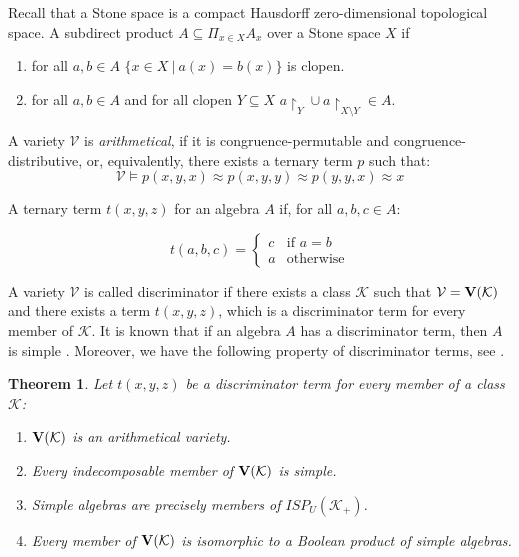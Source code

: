\documentclass[a4paper]{article}
\theoremstyle{defin}
\theoremstyle{theorem}
\newtheorem{theorem}{Theorem}
\theoremstyle{claim}
\theoremstyle{prop}
\theoremstyle{lemma}
\theoremstyle{fact}
\theoremstyle{ex}
\theoremstyle{col}
\begin{document}
Recall that a Stone space is a compact Hausdorff zero-dimensional topological space. A subdirect product $A \subseteq \Pi_{x \in X} A_x$ over a Stone space $X$ if
\begin{enumerate}
\item for all $a, b \in A$ $\{ x \in X \: | \: a(x) = b(x) \}$ is clopen.
\item for all $a, b \in A$ and for all clopen $Y \subseteq X$ $a \upharpoonright_{Y} \cup a \upharpoonright_{X \setminus Y} \in A$.
\end{enumerate}

A variety $\mathcal{V}$ is \emph{arithmetical}, if it is congruence-permutable and congruence-distributive, or, equivalently, there exists a ternary term $p$ such that:
\begin{equation}
\mathcal{V} \models p(x,y,x) \approx p(x,y,y) \approx p(y,y,x) \approx x
\end{equation}

A ternary term $t(x, y, z)$ for an algebra $A$ if, for all $a, b, c \in A$:

\begin{equation}
t(a,b,c) =
  \begin{cases}
  c & \text{if $a = b$} \\
  a & \text{otherwise}
  \end{cases}
\end{equation}

A variety $\mathcal{V}$ is called discriminator if there exists a class $\mathcal{K}$ such that $\mathcal{V} = {\bf V}(\mathcal{K})$ and there exists a term $t(x,y,z)$, which is a discriminator term for every member of $\mathcal{K}$. It is known that if an algebra $A$ has a discriminator term, then $A$ is simple \cite[Lemma 9.2]{sankappanavar1981course}. Moreover, we have the following property of discriminator terms, see \cite[Theorem 9.4]{sankappanavar1981course}.

\begin{theorem} Let $t(x,y,z)$ be a discriminator term for every member of a class $\mathcal{K}$:

\begin{enumerate}
\item ${\bf V}(\mathcal{K})$ is an arithmetical variety.
\item Every indecomposable member of ${\bf V}(\mathcal{K})$ is simple.
\item Simple algebras are precisely members of ${ISP}_U(\mathcal{K}_+)$.
\item Every member of ${\bf V}(\mathcal{K})$ is isomorphic to a Boolean product of simple algebras.
\end{enumerate}
\end{theorem}
\end{document}
